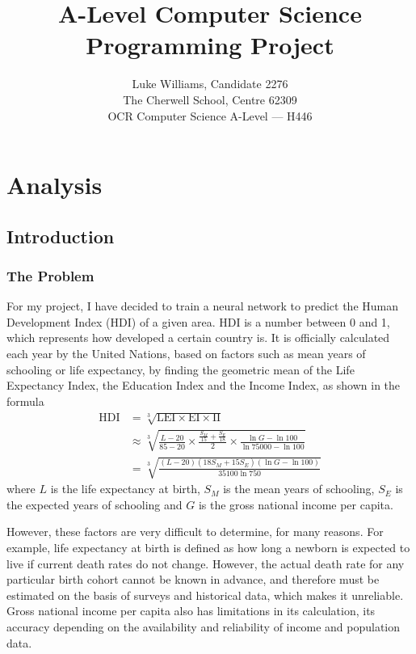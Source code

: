 \documentclass[12pt]{report}
\title{A-Level Computer Science Programming Project}
\author{Luke Williams, Candidate 2276 \\ The Cherwell School, Centre 62309 \\ OCR Computer Science A-Level --- H446}
\date{}
\begin{document}
\maketitle{}
\cleardoublepage{}
\tableofcontents{}

\chapter{Analysis}
\section{Introduction}
\subsection{The Problem}
For my project, I have decided to train a neural network to predict the Human Development Index (HDI) of a given area. HDI is a number between 0 and 1, which represents how developed a certain country is. It is officially calculated each year by the United Nations, based on factors such as mean years of schooling or life expectancy, by finding the geometric mean of the Life Expectancy Index, the Education Index and the Income Index, as shown in the formula 
\begin{equation}\label{eq:hdi}
\begin{split}
    \text{HDI}&=\sqrt[3]{\text{LEI}\times\text{EI}\times\text{II}}\\&\approx\sqrt[3]{\frac{L-20}{85-20}\times\frac{\frac{S_M}{15}+\frac{S_E}{18}}{2}\times\frac{\ln{G}-\ln{100}}{\ln{75000}-\ln{100}}}\\&=\sqrt[3]{\frac{\left(L-20\right)\left(18S_M+15S_E\right)\left(\ln{G}-\ln{100}\right)}{35100\ln{750}}}
\end{split}
\end{equation}
where $L$ is the life expectancy at birth, $S_M$ is the mean years of schooling, $S_E$ is the expected years of schooling and $G$ is the gross national income per capita.

However, these factors are very difficult to determine, for many reasons. For example, life expectancy at birth is defined as how long a newborn is expected to live if current death rates do not change. However, the actual death rate for any particular birth cohort cannot be known in advance, and therefore must be estimated on the basis of surveys and historical data, which makes it unreliable. Gross national income per capita also has limitations in its calculation, its accuracy depending on the availability and reliability of income and population data.
\end{document}
